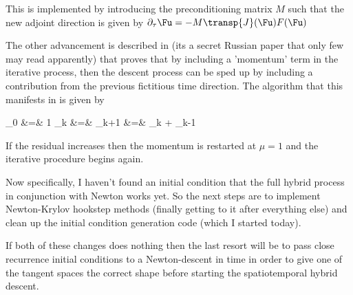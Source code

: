 
This is implemented by introducing the preconditioning matrix $M$ such that the new adjoint direction
is given by  $\partial_\tau \Fu = -M\transp{J}(\Fu) F(\Fu)$

The other advancement is described in (its a secret Russian paper that only few may read apparently)
 that proves that by including a 'momentum' term in the iterative process, then
the descent process can be sped up by including a contribution from the previous fictitious time
direction. The algorithm that this manifests in is given by

\bea \label{eqn:Nesterov_factor}
\mu_0 &=& 1 \continue
\mu_k &=&  \continue
\delta \Fu_{k+1} &=& \delta \Fu_k +  \delta \Fu_{k-1}
\eea

If the residual increases then the momentum is restarted at $\mu = 1$ and the iterative
procedure begins again.

Now specifically, I haven't found an initial condition that the full hybrid process
in conjunction with Newton works yet. So the next steps are to implement Newton-Krylov
hookstep methods (finally getting to it after everything else) and clean up the initial
condition generation code (which I started today).

If both of these changes does nothing then the last resort will be to pass close recurrence
initial conditions to a Newton-descent in time in order to give one of the tangent spaces the
correct shape before starting the spatiotemporal hybrid descent.